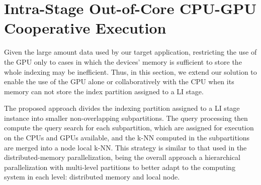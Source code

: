 \section{Intra-Stage Out-of-Core CPU-GPU Cooperative Execution}

Given the large amount data used by our target application, restricting the use 
of the GPU only to cases in 
which the devices' memory is sufficient to store the whole indexing may be inefficient.
Thus, in this section, we extend our solution to enable the use of the 
GPU alone or collaboratively with the CPU when its memory can not store the index partition assigned
to a LI stage. 

The proposed approach divides the indexing partition assigned to a LI stage instance
into smaller non-overlapping subpartitions. The query processing then compute
the query search for each subpartition, which are assigned for execution on the 
CPUs and GPUs available, and the
k-NN computed in the subpartitions are merged into a node local k-NN. This strategy is 
similar to that used in the distributed-memory
parallelization, being the overall approach a hierarchical parallelization with 
multi-level partitions to better adapt to the computing system in each 
level: distributed memory and local node.

%

